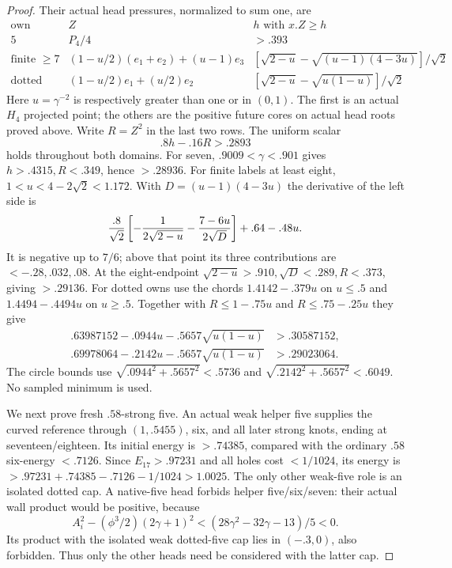 \documentclass[11pt]{article}
\theoremstyle{definition}
\theoremstyle{remark}
\begin{document}
\begin{proof}
Their actual head pressures, normalized to sum one, are
\[
\begin{array}{c|c|c}
\text{own}&Z&h\text{ with }x.Z\ge h\\\hline
5&P_4/4&>.393\\
\text{finite }\ge7&(1-u/2)(e_1+e_2)+(u-1)e_3&
[\sqrt{2-u}-\sqrt{(u-1)(4-3u)}]/\sqrt2\\
\text{dotted}&(1-u/2)e_1+(u/2)e_2&
[\sqrt{2-u}-\sqrt{u(1-u)}]/\sqrt2
\end{array}
\]
Here $u=\gamma^{-2}$ is respectively greater than one or in
$(0,1)$. The first is an actual $H_4$ projected point; the
others are the positive future cores on actual head roots proved
above. Write $R=Z^2$ in the last two rows. The uniform scalar
\begin{equation}\label{app:tail:eq:B20headscalar}
 .8h-.16R>.2893
\end{equation}
holds throughout both domains. For seven,
$.9009<\gamma<.901$ gives $h>.4315,R<.349$, hence $>.28936$.
For finite labels at least eight, $1<u<4-2\sqrt2<1.172$.
With $D=(u-1)(4-3u)$ the derivative of the left side is
\[
 { .8\over\sqrt2}
 \left[-{1\over2\sqrt{2-u}}-{7-6u\over2\sqrt D}\right]
                   +.64-.48u.
\]
It is negative up to $7/6$; above that point its three
contributions are $<-.28,.032,.08$. At the eight-endpoint
$\sqrt{2-u}>.910,\sqrt D<.289,R<.373$, giving $>.29136$.
For dotted owns use the chords $1.4142-.379u$ on $u\le.5$
and $1.4494-.4494u$ on $u\ge.5$.
Together with $R\le1-.75u$ and $R\le.75-.25u$ they give
\[
\begin{split}
.63987152-.0944u-.5657\sqrt{u(1-u)}&>.30587152,\\
.69978064-.2142u-.5657\sqrt{u(1-u)}&>.29023064.
\end{split}
\]
The circle bounds use
$\sqrt{.0944^2+.5657^2}<.5736$ and
$\sqrt{.2142^2+.5657^2}<.6049$. No sampled minimum is used.

We next prove fresh $.58$-strong five. An actual weak helper
five supplies the curved reference through $(1,.5455)$, six,
and all later strong knots, ending at seventeen/eighteen.
Its initial energy is $>.74385$, compared with the ordinary
$.58$ six-energy $<.7126$. Since $E_{17}>.97231$ and all
holes cost $<1/1024$, its energy is
$>.97231+.74385-.7126-1/1024>1.0025$.
The only other weak-five role is an isolated dotted cap.
A native-five head forbids helper five/six/seven: their actual
wall product would be positive, because
\[
 A_i^2-(\phi^3/2)(2\gamma+1)^2
       <(28\gamma^2-32\gamma-13)/5<0.
\]
Its product with the isolated weak dotted-five cap lies in
$(-.3,0)$, also forbidden. Thus only the other heads need be
considered with the latter cap.


\end{proof}
\end{document}
